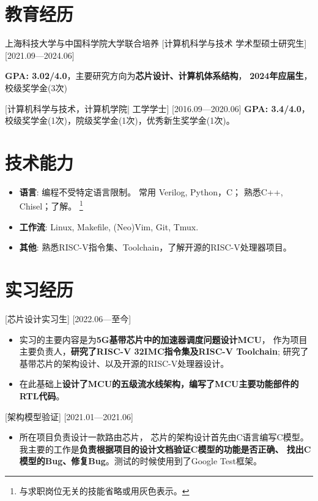 \documentclass{resume}
\begin{document}

\ResumeTitle

\section{教育经历}
\ResumeItem
{上海科技大学与中国科学院大学联合培养}
[\textnormal{计算机科学与技术}  学术型硕士研究生]
[2021.09—2024.06]

\textbf{GPA: 3.02/4.0}，主要研究方向为\textbf{芯片设计、计算机体系结构}，
\textbf{2024年应届生}，校级奖学金(3次)

[\textnormal{计算机科学与技术，计算机学院|} 工学学士]
[2016.09—2020.06]
\textbf{GPA: 3.4/4.0}，校级奖学金(1次)，院级奖学金(1次)，优秀新生奖学金(1次)。

\section{技术能力}
\begin{itemize}
  \item \textbf{语言}: 编程不受特定语言限制。
      常用 Verilog, Python，C； 熟悉C++, Chisel；了解。
      \footnote{与求职岗位无关的技能省略或用灰色表示。}
  \item \textbf{工作流}: Linux, Makefile, (Neo)Vim, Git, Tmux.
  \item \textbf{其他}: 熟悉RISC-V指令集、Toolchain，了解开源的RISC-V处理器项目。
\end{itemize}

\section{实习经历}

[芯片设计实习生]
[2022.06—至今] 
\begin{itemize}
    \item 实习的主要内容是为\textbf{5G基带芯片中的加速器调度问题设计MCU}，
        作为项目主要负责人，\textbf{研究了RISC-V 32IMC指令集及RISC-V Toolchain};
        研究了基带芯片的架构设计、以及开源的RISC-V处理器设计。
    \item 在此基础上\textbf{设计了MCU的五级流水线架构，编写了MCU主要功能部件的RTL代码}。
\end{itemize}
[架构模型验证]
[2021.01—2021.06] 
\begin{itemize}
  \item 所在项目负责设计一款路由芯片，
      芯片的架构设计首先由C语言编写C模型。
      我主要的工作是\textbf{负责根据项目的设计文档验证C模型的功能是否正确、
      找出C模型的Bug、修复Bug}。测试的时候使用到了Google Test框架。
\end{itemize}
\end{document}
